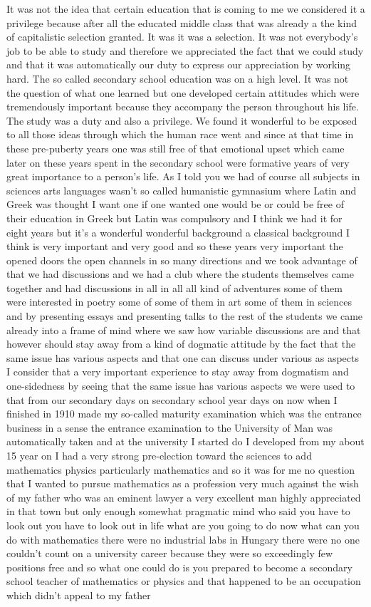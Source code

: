 \documentclass{article}
\begin{document}
It was not the idea that certain education that is coming to me we considered it a privilege because after all the educated middle class that was already a the kind of capitalistic selection granted. It was it was a selection. It was not everybody's job to be able to study and therefore we appreciated the fact that we could study and that it was automatically our duty to express our appreciation by working hard. The so called secondary school education was on a high level. It was not the question of what one learned but one developed certain attitudes which were tremendously important because they accompany the person throughout his life. The study was a duty and also a privilege. We found it wonderful to be exposed to all those ideas through which the human race went and since at that time in these pre-puberty years one was still free of that emotional upset which came later on these years spent in the secondary school were formative years of very great importance to a person's life. As I told you we had of course all subjects in sciences arts languages wasn't so called humanistic gymnasium where Latin and Greek was thought I want one if one wanted one would be or could be free of their education in Greek but Latin was compulsory and I think we had it for eight years but it's a wonderful wonderful background a classical background I think is very important and very good and so these years very important the opened doors the open channels in so many directions and we took advantage of that we had discussions and we had a club where the students themselves came together and had discussions in all in all all kind of adventures some of them were interested in poetry some of some of them in art some of them in sciences and by presenting essays and presenting talks to the rest of the students we came already into a frame of mind where we saw how variable discussions are and that however should stay away from a kind of dogmatic attitude by the fact that the same issue has various aspects and that one can discuss under various as aspects I consider that a very important experience to stay away from dogmatism and one-sidedness by seeing that the same issue has various aspects we were used to that from our secondary days on secondary school year days on now when I finished in 1910 made my so-called maturity examination which was the entrance business in a sense the entrance examination to the University of Man was automatically taken and at the university I started do I developed from my about 15 year on I had a very strong pre-election toward the sciences to add mathematics physics particularly mathematics and so it was for me no question that I wanted to pursue mathematics as a profession very much against the wish of my father who was an eminent lawyer a very excellent man highly appreciated in that town but only enough somewhat pragmatic mind who said you have to look out you have to look out in life what are you going to do now what can you do with mathematics there were no industrial labs in Hungary there were no one couldn't count on a university career because they were so exceedingly few positions free and so what one could do is you prepared to become a secondary school teacher of mathematics or physics and that happened to be an occupation which didn't appeal to my father 
\end{document}
